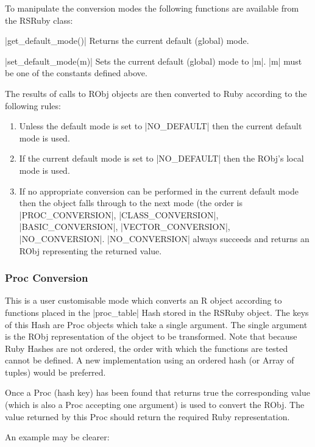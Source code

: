\documentclass[a4paper,12pt]{book}
\newenvironment{TabularDescription}[1]
  {\begin{list}{}%
    {\renewcommand\makelabel[1]{##1:\hfill}%
     \settowidth\labelwidth{\makelabel{#1}}%
     \setlength\leftmargin{\labelwidth+\labelsep}}}%
  {\end{list}}
\begin{document}
To manipulate the conversion modes the following functions are available from the RSRuby class:

\begin{TabularDescription}{|getdefaultmode|}
\item[|get\_default\_mode()|] Returns the current default (global) mode.
\item[|set\_default\_mode(m)|] Sets the current default (global) mode to |m|. |m| must be one of the constants defined above.
\end{TabularDescription}

The results of calls to RObj objects are then converted to Ruby according to the following rules:

\begin{enumerate}
\item Unless the default mode is set to |NO_DEFAULT| then the current default mode is used.
\item If the current default mode is set to |NO_DEFAULT| then the RObj's local mode is used.
\item If no appropriate conversion can be performed in the current default mode then the object falls through to the next mode (the order is |PROC_CONVERSION|, |CLASS_CONVERSION|, |BASIC_CONVERSION|, |VECTOR_CONVERSION|, |NO_CONVERSION|. |NO_CONVERSION| always succeeds and returns an RObj representing the returned value.
\end{enumerate}

\subsubsection{Proc Conversion}

This is a user customisable mode which converts an R object according to functions placed in the |proc_table| Hash stored in the RSRuby object. The keys of this Hash are Proc objects which take a single argument. The single argument is the RObj representation of the object to be transformed. Note that because Ruby Hashes are not ordered, the order with which the functions are tested cannot be defined. A new implementation using an ordered hash (or Array of tuples) would be preferred.

Once a Proc (hash key) has been found that returns true the corresponding value (which is also a Proc accepting one argument) is used to convert the RObj. The value returned by this Proc should return the required Ruby representation.

An example may be clearer:
\end{document}
